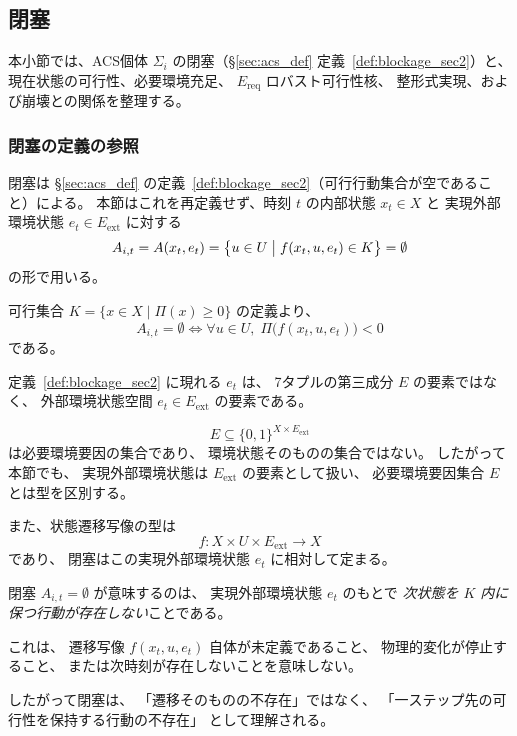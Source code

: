 \subsection{閉塞}
\label{subsec:blockage}

本小節では、ACS個体 $\Sigma_i$ の閉塞（\S\ref{sec:acs_def} 定義~\ref{def:blockage_sec2}）と、
現在状態の可行性、必要環境充足、
$E_{\mathrm{req}}$ ロバスト可行性核、
整形式実現、および崩壊との関係を整理する。

\subsubsection{閉塞の定義の参照}

閉塞は \S\ref{sec:acs_def} の定義~\ref{def:blockage_sec2}（可行行動集合が空であること）による。
本節はこれを再定義せず、時刻 $t$ の内部状態 $x_t\in X$ と
実現外部環境状態 $e_t\in E_{\mathrm{ext}}$ に対する
\[
  A_{i,t}
  =
  A(x_t,e_t)
  =
  \bigl\{
    u\in U
    \bigm|
    f(x_t,u,e_t)\in K
  \bigr\}
  =\emptyset
\]
の形で用いる。

\begin{remark}[閉塞の持続評価関数による書き換え]
\label{rem:blockage_pi_form}
可行集合 $K=\{x\in X\mid\Pi(x)\ge0\}$ の定義より、
\[
  A_{i,t}=\emptyset
  \iff
  \forall u\in U,\;
  \Pi\!\bigl(f(x_t,u,e_t)\bigr)<0
\]
である。
\end{remark}

\begin{remark}[閉塞定義における環境状態の型]
\label{rem:blockage_environment_type}
定義~\ref{def:blockage_sec2} に現れる $e_t$ は、
7タプルの第三成分 $E$ の要素ではなく、
外部環境状態空間
$e_t\in E_{\mathrm{ext}}$
の要素である。

\[
  E
  \subseteq
  \{0,1\}^{X\times E_{\mathrm{ext}}}
\]
は必要環境要因の集合であり、
環境状態そのものの集合ではない。
したがって本節でも、
実現外部環境状態は
$E_{\mathrm{ext}}$ の要素として扱い、
必要環境要因集合 $E$ とは型を区別する。

また、状態遷移写像の型は
\[
  f:
  X\times U\times E_{\mathrm{ext}}
  \longrightarrow X
\]
であり、
閉塞はこの実現外部環境状態 $e_t$ に相対して定まる。
\end{remark}

\begin{remark}
\label{rem:blockage_not_no_transition}
閉塞
$A_{i,t}=\emptyset$
が意味するのは、
実現外部環境状態 $e_t$ のもとで
\emph{次状態を $K$ 内に保つ行動が存在しない}ことである。

これは、
遷移写像 $f(x_t,u,e_t)$ 自体が未定義であること、
物理的変化が停止すること、
または次時刻が存在しないことを意味しない。

したがって閉塞は、
「遷移そのものの不存在」ではなく、
「一ステップ先の可行性を保持する行動の不存在」
として理解される。
\end{remark}

